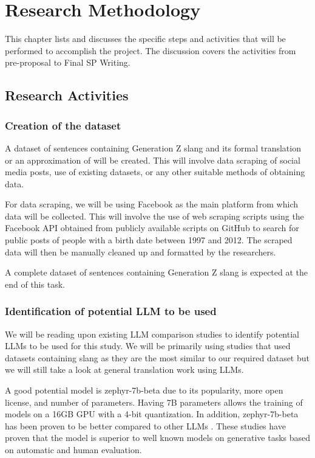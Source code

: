 \chapter{Research Methodology}
This chapter lists and discusses the specific steps and activities that will be performed to accomplish the project. 
The discussion covers the activities from pre-proposal to Final SP Writing.

\section{Research Activities}
\subsection{Creation of the dataset} 
A dataset of sentences containing Generation Z slang and its formal translation or an approximation of will be created. This will involve data scraping of social media posts, use of existing datasets, or any other suitable methods of obtaining data.

For data scraping, we will be using Facebook as the main platform from which data will be collected.
This will involve the use of web scraping scripts using the Facebook API obtained from publicly available scripts on GitHub to search for public posts of people with a birth date between 1997 and 2012. 
The scraped data will then be manually cleaned up and formatted by the researchers.

A complete dataset of sentences containing Generation Z slang is expected at the end of this task. 

\subsection{Identification of potential LLM to be used}
We will be reading upon existing LLM comparison studies to identify potential LLMs to be used for this study.
We will be primarily using studies that used datasets containing slang as they are the most similar to our required dataset but we will still take a look at general translation work using LLMs.

A good potential model is zephyr-7b-beta due to its popularity, more open license, and number of parameters.
Having 7B parameters allows the training of models on a 16GB GPU with a 4-bit quantization.
In addition, zephyr-7b-beta has been proven to be better compared to other LLMs \cite{Zhu_2023} \cite{zhao2024loraland310finetuned}.
These studies have proven that the model is superior to well known models on generative tasks based on automatic and human evaluation.

